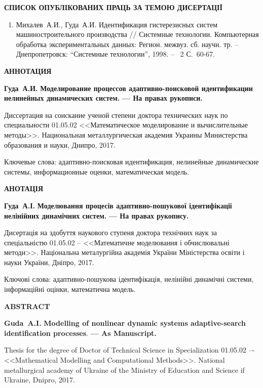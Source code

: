 \documentclass[a4paper,12pt]{atuaref}
\newcommand{\xsect}[1]{\medskip\begin{center}\textbf{#1}\end{center}\medskip\penalty10000}
\begin{document}
\xsect{СПИСОК ОПУБЛІКОВАНИХ ПРАЦЬ ЗА ТЕМОЮ ДИСЕРТАЦІЇ}

\begin{enumerate}

\item Михалев~А.И., Гуда~А.И.
Идентификация  гистерезисных систем машиностроительного производства
// Системные технологии. Компьютерная обработка экспериментальных
данных: Регион. межвуз. сб. научн. тр. -- Днепропетровск:
``Системные технологии'', 1998. -- \No~2 С.~60-67.

\end{enumerate}


\xsect{АННОТАЦИЯ}

\textbf{Гуда~А.И.}
\textbf{Моделирование процессов адаптивно-поисковой идентификации нелинейных динамических систем.}
\textbf{--- На правах рукописи.}

Диссертация на соискание ученой степени доктора технических
наук по специальности 01.05.02
<<Математическое моделирование и вычислительные методы>>.
Национальная металлургическая академия Украины Министерства образования и науки, Днипро, 2017.


Ключевые слова:
адаптивно-поисковая идентификация, нелинейные динамические системы,
информационные оценки, математическая модель.


\xsect{АНОТАЦІЯ}

\textbf{Гуда~А.І.}
\textbf{Моделювання процесів адаптивно-пошукової ідентифікації нелінійних динамічних систем.}
\textbf{--- На правах рукопису.}

Дисертація на здобуття наукового ступеня доктора технічних наук
за спеціальністю 01.05.02 --
<<Математичне моделювання і обчислювальні методи>>.
Національна металургійна академія України
Міністерства освіти і науки України, Дніпро, 2017.


Ключові слова: адаптивно-пошукова ідентифікація, нелінійні динамічні
системи, інформаційні оцінки, математична модель.



\xsect{ABSTRACT}

\textbf{Guda~A.I.}
\textbf{Modelling of nonlinear dynamic systems adaptive-search identification processes}.
\textbf{--- As Manuscript.}

Thesis for the degree of Doctor of Technical Science in Specialization 01.05.02 –-
<<Mathematical Modelling and Computational Methods>>.
National metallurgical academy of Ukraine  of the Ministry of Education and Science if Ukraine, Dnipro, 2017.
\end{document}
